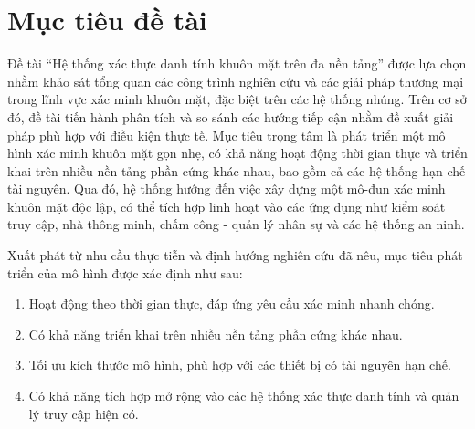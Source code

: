 \section{Mục tiêu đề tài}
Đề tài “Hệ thống xác thực danh tính khuôn mặt trên đa nền tảng” được lựa chọn nhằm khảo sát tổng quan các công trình nghiên cứu và các giải pháp thương mại trong lĩnh vực xác minh khuôn mặt, đặc biệt trên các hệ thống nhúng. Trên cơ sở đó, đề tài tiến hành phân tích và so sánh các hướng tiếp cận nhằm đề xuất giải pháp phù hợp với điều kiện thực tế. Mục tiêu trọng tâm là phát triển một mô hình xác minh khuôn mặt gọn nhẹ, có khả năng hoạt động thời gian thực và triển khai trên nhiều nền tảng phần cứng khác nhau, bao gồm cả các hệ thống hạn chế tài nguyên. Qua đó, hệ thống hướng đến việc xây dựng một mô-đun xác minh khuôn mặt độc lập, có thể tích hợp linh hoạt vào các ứng dụng như kiểm soát truy cập, nhà thông minh, chấm công - quản lý nhân sự và các hệ thống an ninh.

Xuất phát từ nhu cầu thực tiễn và định hướng nghiên cứu đã nêu, mục tiêu phát triển của mô hình được xác định như sau:
\begin{enumerate}
    \item Hoạt động theo thời gian thực, đáp ứng yêu cầu xác minh nhanh chóng.
    \item Có khả năng triển khai trên nhiều nền tảng phần cứng khác nhau.
    \item Tối ưu kích thước mô hình, phù hợp với các thiết bị có tài nguyên hạn chế.
    \item Có khả năng tích hợp mở rộng vào các hệ thống xác thực danh tính và quản lý truy cập hiện có.
\end{enumerate}
